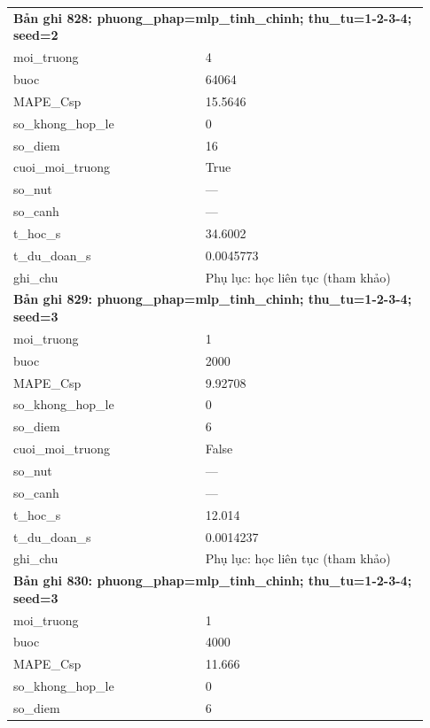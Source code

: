 \begin{longtable}{p{0.43\linewidth}p{0.50\linewidth}}
\midrule
\multicolumn{2}{p{0.95\linewidth}}{\textbf{Bản ghi 828: phuong\_phap=mlp\_tinh\_chinh; thu\_tu=1-2-3-4; seed=2}} \\
moi\_\allowbreak truong & 4 \\
buoc & 64064 \\
MAPE\_\allowbreak Csp & 15.5646 \\
so\_\allowbreak khong\_\allowbreak hop\_\allowbreak le & 0 \\
so\_\allowbreak diem & 16 \\
cuoi\_\allowbreak moi\_\allowbreak truong & True \\
so\_\allowbreak nut & — \\
so\_\allowbreak canh & — \\
t\_\allowbreak hoc\_\allowbreak s & 34.6002 \\
t\_\allowbreak du\_\allowbreak doan\_\allowbreak s & 0.0045773 \\
ghi\_\allowbreak chu & Phụ lục: học liên tục (tham khảo) \\
\midrule
\multicolumn{2}{p{0.95\linewidth}}{\textbf{Bản ghi 829: phuong\_phap=mlp\_tinh\_chinh; thu\_tu=1-2-3-4; seed=3}} \\
moi\_\allowbreak truong & 1 \\
buoc & 2000 \\
MAPE\_\allowbreak Csp & 9.92708 \\
so\_\allowbreak khong\_\allowbreak hop\_\allowbreak le & 0 \\
so\_\allowbreak diem & 6 \\
cuoi\_\allowbreak moi\_\allowbreak truong & False \\
so\_\allowbreak nut & — \\
so\_\allowbreak canh & — \\
t\_\allowbreak hoc\_\allowbreak s & 12.014 \\
t\_\allowbreak du\_\allowbreak doan\_\allowbreak s & 0.0014237 \\
ghi\_\allowbreak chu & Phụ lục: học liên tục (tham khảo) \\
\midrule
\multicolumn{2}{p{0.95\linewidth}}{\textbf{Bản ghi 830: phuong\_phap=mlp\_tinh\_chinh; thu\_tu=1-2-3-4; seed=3}} \\
moi\_\allowbreak truong & 1 \\
buoc & 4000 \\
MAPE\_\allowbreak Csp & 11.666 \\
so\_\allowbreak khong\_\allowbreak hop\_\allowbreak le & 0 \\
so\_\allowbreak diem & 6 \\

\end{longtable}
